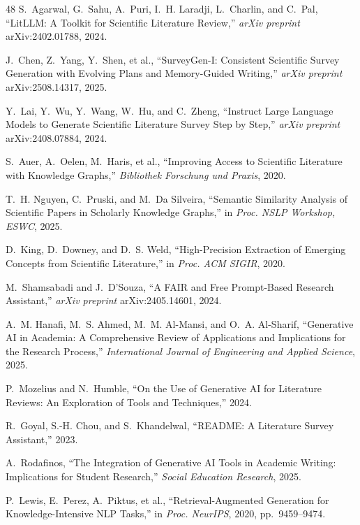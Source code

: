 \documentclass[conference,10pt,twocolumn]{IEEEtran}
\begin{document}
\begin{thebibliography}{48}
S.~Agarwal, G.~Sahu, A.~Puri, I.~H. Laradji, L.~Charlin, and C.~Pal, ``LitLLM: A Toolkit for Scientific Literature Review,'' \textit{arXiv preprint} arXiv:2402.01788, 2024.

J.~Chen, Z.~Yang, Y.~Shen, et al., ``SurveyGen-I: Consistent Scientific Survey Generation with Evolving Plans and Memory-Guided Writing,'' \textit{arXiv preprint} arXiv:2508.14317, 2025.

Y.~Lai, Y.~Wu, Y.~Wang, W.~Hu, and C.~Zheng, ``Instruct Large Language Models to Generate Scientific Literature Survey Step by Step,'' \textit{arXiv preprint} arXiv:2408.07884, 2024.

S.~Auer, A.~Oelen, M.~Haris, et al., ``Improving Access to Scientific Literature with Knowledge Graphs,'' \textit{Bibliothek Forschung und Praxis}, 2020.

T.~H. Nguyen, C.~Pruski, and M.~Da Silveira, ``Semantic Similarity Analysis of Scientific Papers in Scholarly Knowledge Graphs,'' in \textit{Proc. NSLP Workshop, ESWC}, 2025.

D.~King, D.~Downey, and D.~S. Weld, ``High-Precision Extraction of Emerging Concepts from Scientific Literature,'' in \textit{Proc. ACM SIGIR}, 2020.

M.~Shamsabadi and J.~D'Souza, ``A FAIR and Free Prompt-Based Research Assistant,'' \textit{arXiv preprint} arXiv:2405.14601, 2024.

A.~M. Hanafi, M.~S. Ahmed, M.~M. Al-Mansi, and O.~A. Al-Sharif, ``Generative AI in Academia: A Comprehensive Review of Applications and Implications for the Research Process,'' \textit{International Journal of Engineering and Applied Science}, 2025.

P.~Mozelius and N.~Humble, ``On the Use of Generative AI for Literature Reviews: An Exploration of Tools and Techniques,'' 2024.

R.~Goyal, S.-H. Chou, and S.~Khandelwal, ``README: A Literature Survey Assistant,'' 2023.

A.~Rodafinos, ``The Integration of Generative AI Tools in Academic Writing: Implications for Student Research,'' \textit{Social Education Research}, 2025.

P.~Lewis, E.~Perez, A.~Piktus, et al., ``Retrieval-Augmented Generation for Knowledge-Intensive NLP Tasks,'' in \textit{Proc. NeurIPS}, 2020, pp.~9459--9474.


\end{thebibliography}
\end{document}
